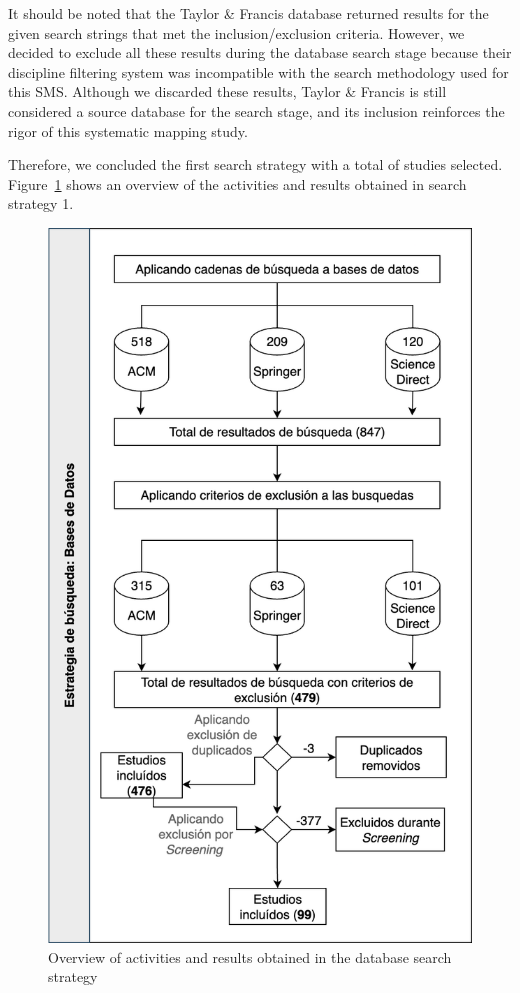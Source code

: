 It should be noted that the Taylor \& Francis database returned results for the given search strings that met the inclusion/exclusion criteria. However, we decided to exclude all these results during the database search stage because their discipline filtering system was incompatible with the search methodology used for this SMS. Although we discarded these results, Taylor \& Francis is still considered a source database for the search stage, and its inclusion reinforces the rigor of this systematic mapping study.


Therefore, we concluded the first search strategy with a total of \screenTot{} studies selected. Figure~\ref{fig:overview} shows an overview of the activities and results obtained in search strategy 1.

\begin{figure}[htbp]
	\centering
	\includegraphics[scale=0.25]{resources/figures/overview.png}
	\caption{Overview of activities and results obtained in the database search strategy}
	\label{fig:overview}
\end{figure}

